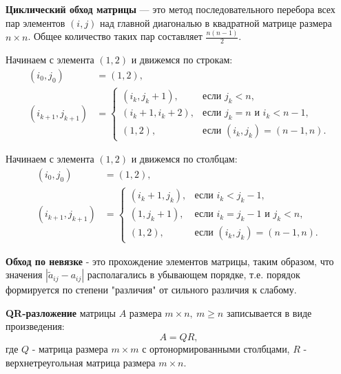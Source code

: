 \textbf{Циклический обход матрицы} — это метод последовательного перебора всех пар элементов $(i,j)$ над главной диагональю в квадратной матрице размера $n \times n$. Общее количество таких пар составляет $\frac{n(n-1)}{2}$.

Начинаем с элемента $(1,2)$ и движемся по строкам:
\begin{equation}
\begin{aligned}
(i_0, j_0) &= (1, 2), \\
(i_{k+1}, j_{k+1}) &= 
\begin{cases} 
(i_k, j_k + 1), & \text{если } j_k < n, \\
(i_k + 1, i_k + 2), & \text{если } j_k = n \text{ и } i_k < n-1, \\
(1, 2), & \text{если } (i_k,j_k) = (n-1,n).
\end{cases}
\end{aligned}
\end{equation}

Начинаем с элемента $(1,2)$ и движемся по столбцам:
\begin{equation}
\begin{aligned}
(i_0, j_0) &= (1, 2), \\
(i_{k+1}, j_{k+1}) &= 
\begin{cases} 
(i_k + 1, j_k), & \text{если } i_k < j_k - 1, \\
(1, j_k + 1), & \text{если } i_k = j_k - 1 \text{ и } j_k < n, \\
(1, 2), & \text{если } (i_k,j_k) = (n-1,n).
\end{cases}
\end{aligned}
\end{equation}

\textbf{Обход по невязке} - это прохождение элементов матрицы, таким образом, что значения \(|\tilde{a}_{ij} - a_{ij}|\) располагались в убывающем порядке, т.е.  порядок формируется по степени "различия"\(\) от сильного различия к слабому.

\textbf{QR-разложение} матрицы \(A\) размера \(m\times n,\ m\ge n  \) записывается в виде произведения:  \[A = QR,\] где \(Q\) - матрица размера \(m \times m\) с ортонормированными столбцами, \(R\) - верхнетреугольная матрица размера \(m \times n\).
